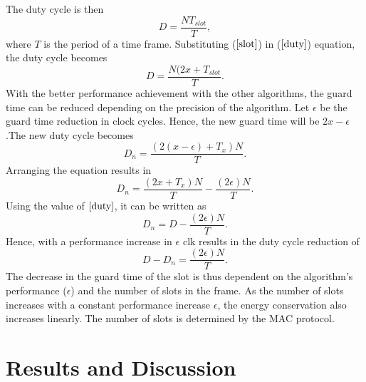 \documentclass[a4paper,10pt]{report}
\begin{document}
The duty cycle is then
\begin{equation}
D = \frac{NT_{slot}}{T}, \label{duty}
\end{equation}
where $T$ is the period of a time frame. \newline Substituting ($\ref{slot}$) in ($\ref{duty}$) equation, the duty cycle becomes
\begin{equation}
D= \frac{N(2x+T_{slot}}{T}.
\end{equation}
With the better performance achievement with the other algorithms, the guard time can be reduced depending on the precision of the
algorithm. Let $\epsilon$ be the guard time reduction in clock cycles. Hence, the new guard time will be $2x-\epsilon$.\newline The
new duty cycle becomes 
\begin{equation}
D_n=\frac{(2(x-\epsilon)+T_x)N}{T}.
\end{equation}
Arranging the equation results in
\begin{equation}
D_n= \frac{(2x+T_x)N}{T} - \frac{(2\epsilon)N}{T}.
\end{equation}
Using the value of $\ref{duty}$, it can be written as
\begin{equation}
D_n= D - \frac{(2\epsilon)N}{T}.
\end{equation}
Hence, with a performance increase in $\epsilon$ clk results in the
duty cycle reduction of
\begin{equation}
D - D_n = \frac{(2\epsilon)N}{T}.
\end{equation}
The decrease in the guard time of the slot is thus dependent on the algorithm's performance ($\epsilon$) and the number of slots in the
frame. As the number of slots increases with a constant performance increase $\epsilon$, the energy conservation also increases linearly. The number of slots is determined by the MAC protocol.
\chapter{\textbf{Results and Discussion}}
\end{document}
